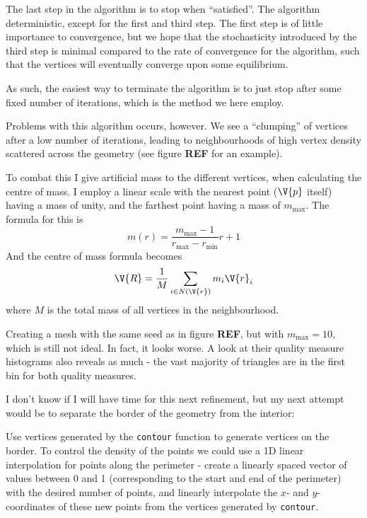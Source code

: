 \documentclass[sigconf]{acmart}
\begin{document}
The last step in the algorithm is to stop when  ``satisfied''. The algorithm deterministic, except for the first and third step. The first step is of little importance to convergence, but we hope that the stochasticity introduced by the third step is minimal compared to the rate of convergence for the algorithm, such that the vertices will eventually converge upon some equilibrium.

As such, the easiest way to terminate the algorithm is to just stop after some fixed number of iterations, which is the method we here employ.

Problems with this algorithm occurs, however. We see a ``clumping'' of vertices after a low number of iterations, leading to neighbourhoods of high vertex density scattered across the geometry (see figure \textbf{REF} for an example).

To combat this I give artificial mass to the different vertices, when calculating the centre of mass. I employ a linear scale with the nearest point ($ \V{p} $ itself) having a mass of unity, and the farthest point having a mass of $ m_{\max} $. The formula for this is
\begin{equation}\label{key}
	m(r) = \frac{m_{\max} - 1}{r_{\max} - r_{\min}} r + 1
\end{equation}
And the centre of mass formula becomes
\begin{equation}\label{key}
	\V{R} = \frac{1}{M} \sum_{i \in N(\V{r})} m_i \V{r}_i
\end{equation}
where $ M $ is the total mass of all vertices in the neighbourhood.

Creating a mesh with the same seed as in figure \textbf{REF}, but with $ m_{\max} = 10 $, which is still not ideal. In fact, it looks worse. A look at their quality measure histograms also reveals as much - the vast majority of triangles are in the first bin for both quality measures.

I don't know if I will have time for this next refinement, but my next attempt would be to separate the border of the geometry from the interior:

Use vertices generated by the \texttt{contour} function to generate vertices on the border. To control the density of the points we could use a 1D linear interpolation for points along the perimeter - create a linearly spaced vector of values between 0 and 1 (corresponding to the start and end of the perimeter) with the desired number of points, and linearly interpolate the $ x $- and $ y $-coordinates of these new points from the vertices generated by \texttt{contour}.
\end{document}
